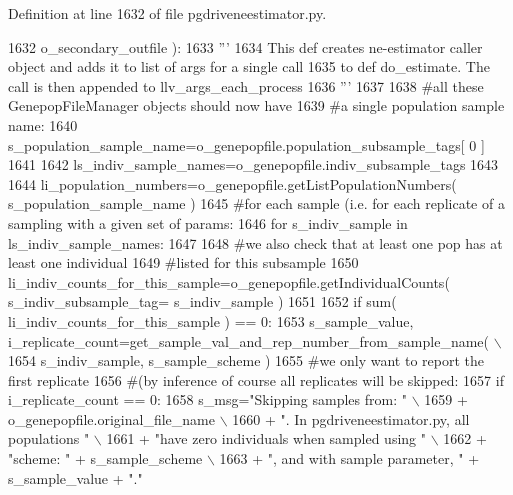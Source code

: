 Definition at line 1632 of file pgdriveneestimator.\+py.


\begin{DoxyCode}
1632                                             o\_secondary\_outfile ):
1633     \textcolor{stringliteral}{'''     }
1634 \textcolor{stringliteral}{    This def creates ne-estimator caller object and adds it to list of args for a single call}
1635 \textcolor{stringliteral}{    to def do\_estimate.  The call is then appended to llv\_args\_each\_process}
1636 \textcolor{stringliteral}{    '''}
1637 
1638     \textcolor{comment}{#all these GenepopFileManager objects should now have}
1639     \textcolor{comment}{#a single population sample name:}
1640     s\_population\_sample\_name=o\_genepopfile.population\_subsample\_tags[ 0 ]
1641 
1642     ls\_indiv\_sample\_names=o\_genepopfile.indiv\_subsample\_tags
1643 
1644     li\_population\_numbers=o\_genepopfile.getListPopulationNumbers( s\_population\_sample\_name )
1645     \textcolor{comment}{#for each sample (i.e. for each replicate of a sampling with a given set of params:}
1646     \textcolor{keywordflow}{for} s\_indiv\_sample \textcolor{keywordflow}{in} ls\_indiv\_sample\_names:
1647 
1648         \textcolor{comment}{#we also check that at least one pop has at least one individual}
1649         \textcolor{comment}{#listed for this subsample}
1650         li\_indiv\_counts\_for\_this\_sample=o\_genepopfile.getIndividualCounts( s\_indiv\_subsample\_tag=
      s\_indiv\_sample )
1651 
1652         \textcolor{keywordflow}{if} sum( li\_indiv\_counts\_for\_this\_sample ) == 0:
1653             s\_sample\_value, i\_replicate\_count=get\_sample\_val\_and\_rep\_number\_from\_sample\_name( \(\backslash\)
1654                                             s\_indiv\_sample, s\_sample\_scheme )
1655             \textcolor{comment}{#we only want to report the first replicate}
1656             \textcolor{comment}{#(by inference of course all replicates will be skipped:}
1657             \textcolor{keywordflow}{if} i\_replicate\_count == 0:
1658                 s\_msg=\textcolor{stringliteral}{"Skipping samples from: "} \(\backslash\)
1659                         + o\_genepopfile.original\_file\_name \(\backslash\)
1660                         + \textcolor{stringliteral}{".  In pgdriveneestimator.py, all populations "} \(\backslash\)
1661                         + \textcolor{stringliteral}{"have zero individuals when sampled using "} \(\backslash\)
1662                         + \textcolor{stringliteral}{"scheme: "} + s\_sample\_scheme \(\backslash\)
1663                         + \textcolor{stringliteral}{", and with sample parameter, "} + s\_sample\_value + \textcolor{stringliteral}{"."}

\end{DoxyCode}
